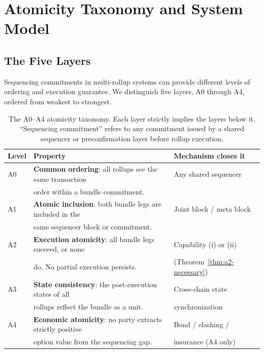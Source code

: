 %

\section{Atomicity Taxonomy and System Model}
\label{sec:taxonomy}

\subsection{The Five Layers}
\label{sec:layers}

Sequencing commitments in multi-rollup systems can provide different
levels of ordering and execution guarantee. We distinguish five layers,
A0 through A4, ordered from weakest to strongest.

\begin{table}[h]
\centering
\small
\caption{The A0--A4 atomicity taxonomy. Each layer strictly implies the
  layers below it. ``Sequencing commitment'' refers to any commitment
  issued by a shared sequencer or preconfirmation layer before rollup
  execution.}
\label{tab:taxonomy}
\begin{tabular}{@{}lll@{}}
\toprule
Level & Property & Mechanism closes it \\
\midrule
A0 & \textbf{Common ordering}: all rollups see the same transaction & Any shared sequencer \\
   & order within a bundle commitment. & \\
A1 & \textbf{Atomic inclusion}: both bundle legs are included in the & Joint block / meta block \\
   & same sequencer block or commitment. & \\
A2 & \textbf{Execution atomicity}: all bundle legs succeed, or none & Capability (i) or (ii) \\
   & do. No partial execution persists. & (Theorem~\ref{thm:a2-necessary}) \\
A3 & \textbf{State consistency}: the post-execution states of all & Cross-chain state \\
   & rollups reflect the bundle as a unit. & synchronization \\
A4 & \textbf{Economic atomicity}: no party extracts strictly positive & Bond / slashing / \\
   & option value from the sequencing gap. & insurance (A4 only) \\
\bottomrule
\end{tabular}
\end{table}

